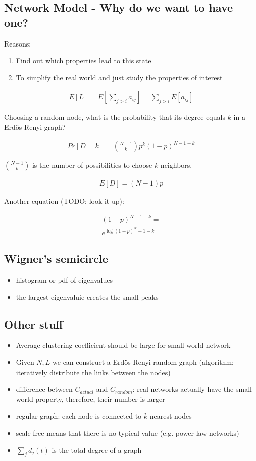 \documentclass{article}
\begin{document}
\subsection{Network Model - Why do we want to have one?}

Reasons:
\begin{enumerate}
\item Find out which properties lead to this state
\item To simplify the real world and just study the properties of interest
\end{enumerate}

\begin{align}
E[L] = E[\sum_{j>i}a_{ij}] = \sum_{j>i}E[a_{ij}]
\end{align}

Choosing a random node, what is the probability that its degree equals
$k$ in a Erd\"os-Renyi graph?

\begin{align}
Pr[D=k] = {N - 1 \choose k}p^k(1-p)^{N-1-k}
\end{align}

${N - 1 \choose k}$ is the number of possibilities to choose $k$
neighbors.

\begin{align}
E[D] = (N - 1)p
\end{align}

Another equation (TODO: look it up):

\begin{align}
  (1 - p)^{N-1-k} =\\
  e^{\log (1-p)^N-1-k}
\end{align}

\subsection{Wigner's semicircle}

\begin{itemize}
\item histogram or pdf of eigenvalues
\item the largest eigenvaluie creates the small peaks 
\end{itemize}

\subsection{Other stuff}
\begin{itemize}
\item Average clustering coefficient should be large for small-world
  network
\item Given $N, L$ we can construct a Erd\"os-Renyi random graph
  (algorithm: iteratively distribute the links between the nodes)
\item difference between $C_{actual}$ and $C_{random}$: real networks
  actually have the small world property, therefore, their number is
  larger
\item regular graph: each node is connected to $k$ nearest nodes
\item scale-free means that there is no typical value (e.g. power-law
  networks)
\item $\sum_jd_j(t)$ is the total degree of a graph
\end{itemize}
\end{document}
